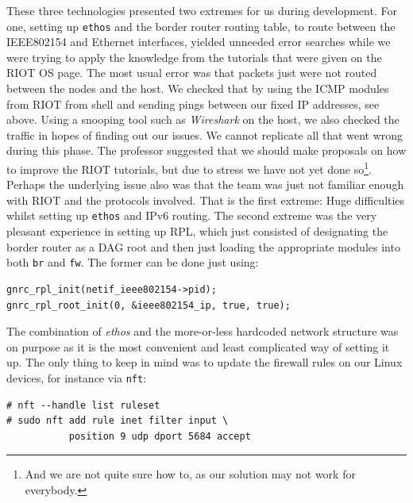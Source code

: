 \documentclass[acmtog, language=english, nonacm]{acmart}
\begin{document}
    These three technologies presented two extremes for us during development. For one, setting up \texttt{ethos} and the border router routing table, to route between the IEEE802154 and Ethernet interfaces, yielded unneeded error searches while we were trying to apply the knowledge from the tutorials that were given on the RIOT OS page. The most usual error was that packets just were not routed between the nodes and the host. We checked that by using the ICMP modules from RIOT from shell and sending pings between our fixed IP addresses, see above. Using a snooping tool such as \emph{Wireshark} on the host, we also checked the traffic in hopes of finding out our issues. We cannot replicate all that went wrong during this phase. The professor suggested that we should make proposals on how to improve the RIOT tutorials, but due to stress we have not yet done so\footnote{And we are not quite sure how to, as our solution may not work for everybody.}. Perhaps the underlying issue also was that the team was just not familiar enough with RIOT and the protocols involved. That is the first extreme: Huge difficulties whilst setting up \texttt{ethos} and IPv6 routing. The second extreme was the very pleasant experience in setting up RPL, which just consisted of designating the border router as a DAG root and then just loading the appropriate modules into both \texttt{br} and \texttt{fw}. The former can be done just using:

    \begin{minipage}{\linewidth}
        \vspace*{\baselineskip}
        \begin{verbatim}
gnrc_rpl_init(netif_ieee802154->pid);
gnrc_rpl_root_init(0, &ieee802154_ip, true, true);
        \end{verbatim}
        \vspace*{\baselineskip}
    \end{minipage}

    The combination of \emph{ethos} and the more-or-less hardcoded network structure was on purpose as it is the most convenient and least complicated way of setting it up. The only thing to keep in mind was to update the firewall rules on our Linux devices, for instance via \texttt{nft}:

    \begin{minipage}{\linewidth}
        \vspace*{\baselineskip}
        \begin{verbatim}
# nft --handle list ruleset
# sudo nft add rule inet filter input \
           position 9 udp dport 5684 accept
        \end{verbatim}
        \vspace*{\baselineskip}
    \end{minipage}
\end{document}
